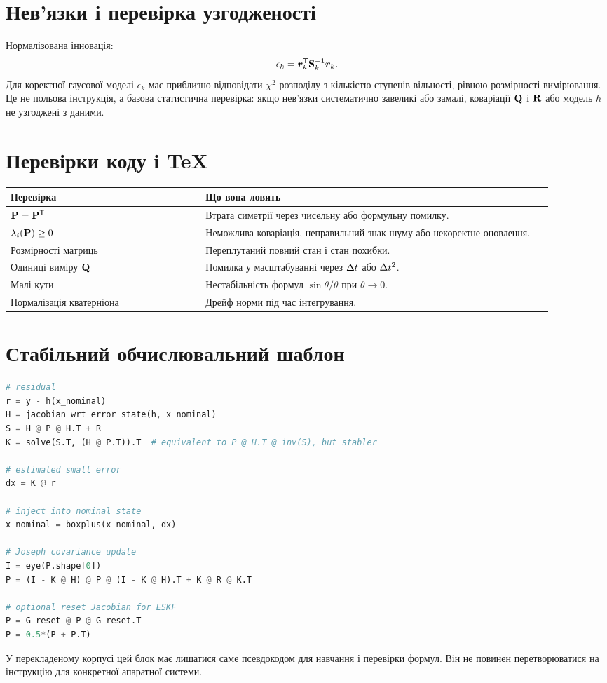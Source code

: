 \section{Нев'язки і перевірка узгодженості}

Нормалізована інновація:
\begin{equation}\label{eq:nis_session02}
\epsilon_k=\bm{r}_k^{\mathsf{T}}\mathbf{S}_k^{-1}\bm{r}_k.
\end{equation}
Для коректної гаусової моделі $\epsilon_k$ має приблизно відповідати $\chi^2$-розподілу з кількістю ступенів вільності, рівною розмірності вимірювання. Це не польова інструкція, а базова статистична перевірка: якщо нев'язки систематично завеликі або замалі, коваріації $\mathbf{Q}$ і $\mathbf{R}$ або модель $h$ не узгоджені з даними.

\section{Перевірки коду і TeX}

\begin{longtable}{L{0.32\linewidth}L{0.58\linewidth}}
\toprule
Перевірка & Що вона ловить\\
\midrule
$\mathbf{P}=\mathbf{P}^{\mathsf{T}}$ & Втрата симетрії через чисельну або формульну помилку.\\
$\lambda_i(\mathbf{P})\ge 0$ & Неможлива коваріація, неправильний знак шуму або некоректне оновлення.\\
Розмірності матриць & Переплутаний повний стан і стан похибки.\\
Одиниці виміру $\mathbf{Q}$ & Помилка у масштабуванні через $\Delta t$ або $\Delta t^2$.\\
Малі кути & Нестабільність формул $\sin\theta/\theta$ при $\theta\to0$.\\
Нормалізація кватерніона & Дрейф норми під час інтегрування.\\
\bottomrule
\end{longtable}

\section{Стабільний обчислювальний шаблон}

\begin{lstlisting}[language=Python,caption={Математичний псевдокод корекції.}]
# residual
r = y - h(x_nominal)
H = jacobian_wrt_error_state(h, x_nominal)
S = H @ P @ H.T + R
K = solve(S.T, (H @ P.T)).T  # equivalent to P @ H.T @ inv(S), but stabler

# estimated small error
dx = K @ r

# inject into nominal state
x_nominal = boxplus(x_nominal, dx)

# Joseph covariance update
I = eye(P.shape[0])
P = (I - K @ H) @ P @ (I - K @ H).T + K @ R @ K.T

# optional reset Jacobian for ESKF
P = G_reset @ P @ G_reset.T
P = 0.5*(P + P.T)
\end{lstlisting}

У перекладеному корпусі цей блок має лишатися саме псевдокодом для навчання і перевірки формул. Він не повинен перетворюватися на інструкцію для конкретної апаратної системи.

